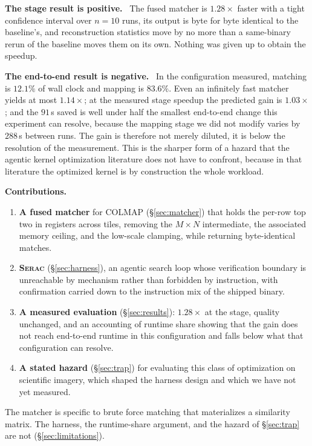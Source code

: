 \documentclass[conference]{IEEEtran}
\newcommand{\para}[1]{\smallskip\noindent\textbf{#1}\ }
\newcommand{\sys}{\textnormal{\textsc{Serac}}\xspace}
\begin{document}
\para{The stage result is positive.} The fused matcher is $1.28\times$ faster
with a tight confidence interval over $n = 10$ runs, its output is byte for
byte identical to the baseline's, and reconstruction statistics move by no more
than a same-binary rerun of the baseline moves them on its own. Nothing was
given up to obtain the speedup.

\para{The end-to-end result is negative.} In the configuration measured,
matching is $12.1\%$ of wall clock and mapping is $83.6\%$. Even an infinitely
fast matcher yields at most $1.14\times$; at the measured stage speedup the
predicted gain is $1.03\times$; and the $91$\,s saved is well under half the
smallest end-to-end change this experiment can resolve, because the mapping
stage we did not modify varies by $288$\,s between runs. The gain is therefore
not merely diluted, it is below the resolution of the measurement. This is the
sharper form of a hazard that the agentic kernel optimization literature does
not have to confront, because in that literature the optimized kernel is by
construction the whole workload.

\para{Contributions.}
\begin{enumerate}[leftmargin=*,topsep=2pt,itemsep=2pt]
\item \textbf{A fused matcher} for COLMAP (\S\ref{sec:matcher}) that holds the
per-row top two in registers across tiles, removing the $M \times N$
intermediate, the associated memory ceiling, and the low-scale clamping, while
returning byte-identical matches.
\item \textbf{\sys} (\S\ref{sec:harness}), an agentic search loop whose
verification boundary is unreachable by mechanism rather than forbidden by
instruction, with confirmation carried down to the instruction mix of the
shipped binary.
\item \textbf{A measured evaluation} (\S\ref{sec:results}): $1.28\times$ at the
stage, quality unchanged, and an accounting of runtime share showing that the
gain does not reach end-to-end runtime in this configuration and falls below
what that configuration can resolve.
\item \textbf{A stated hazard} (\S\ref{sec:trap}) for evaluating this class of
optimization on scientific imagery, which shaped the harness design and which we
have not yet measured.
\end{enumerate}

The matcher is specific to brute force matching that materializes a similarity
matrix. The harness, the runtime-share argument, and the hazard of
\S\ref{sec:trap} are not (\S\ref{sec:limitations}).
\end{document}
